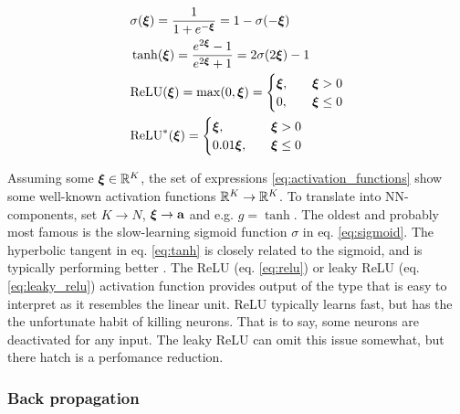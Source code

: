     \begin{subequations}\label{eq:activation_functions}
        \begin{align}
            &\sigma(\svec{\xi}) = \frac{1}{1+e^{-\svec{\xi}}} = 1- \sigma(-\svec{\xi})\label{eq:sigmoid}\\
            &\tanh(\svec{\xi}) = \frac{e^{2\svec{\xi}}-1}{e^{2\svec{\xi}}+1} = 2\sigma(2\svec{\xi}) -1\label{eq:tanh} \\
            &\mathrm{ReLU}(\svec{\xi}) = \max(0,\svec{\xi}) = \begin{cases}
                \svec{\xi},\quad &\svec{\xi} >0 \\
                0,\quad &\svec{\xi} \leq 0
            \end{cases} \label{eq:relu}\\
            &\mathrm{ReLU}^*(\svec{\xi})  = \begin{cases}
                \svec{\xi},\quad &\svec{\xi} >0 \\
                0.01\svec{\xi},\quad &\svec{\xi} \leq 0
            \end{cases} \label{eq:leaky_relu}
        \end{align}
    \end{subequations}

    Assuming some $\svec{\xi} \in \RR[K]$, the set of expressions \eqref{eq:activation_functions} show some well-known activation functions $\RR[K] \to \RR[K]$. To translate into NN-components, set $K\to N$, $\svec{\xi} \to \vec{a}$ and e.g. $g = \tanh$. 
    The oldest and probably most famous is the slow-learning sigmoid function $\sigma$ in eq. \eqref{eq:sigmoid}. The hyperbolic tangent in eq. \eqref{eq:tanh} is closely related to the sigmoid, and is typically performing better \citep{Goodfellow2016}. The ReLU (eq. \eqref{eq:relu}) or leaky ReLU (eq. \eqref{eq:leaky_relu}) activation function provides output of the type that is easy to interpret as it resembles the linear unit. ReLU typically learns fast, but has the the unfortunate habit of killing neurons. That is to say, some neurons are deactivated for any input. The leaky ReLU can omit this issue somewhat, but there hatch is a perfomance reduction.

    





    \subsubsection{Back propagation}\label{sec:back_propagation}


